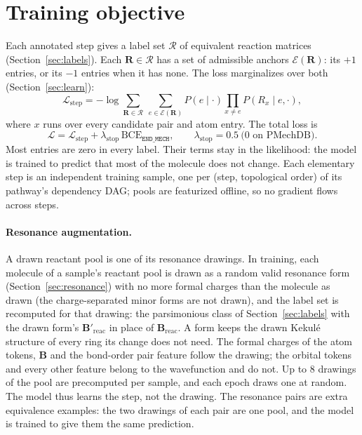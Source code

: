 \documentclass[11pt,a4paper]{article}
\newcommand{\vb}[1]{\bm{#1}}
\begin{document}
\section{Training objective}
\label{sec:loss}
Each annotated step gives a label set $\mathcal{R}$ of equivalent reaction matrices (Section~\ref{sec:labels}). Each $\vb{R}\in\mathcal{R}$ has a set of admissible anchors $\mathcal{E}(\vb{R})$: its $+1$ entries, or its $-1$ entries when it has none. The loss marginalizes over both (Section~\ref{sec:learn}):
\begin{equation}
\mathcal{L}_{\mathrm{step}}=-\log\sum_{\vb{R}\in\mathcal{R}}\ \sum_{e\in\mathcal{E}(\vb{R})}P(e\mid\cdot)\prod_{x\ne e}P(R_x\mid e,\cdot),
\end{equation}
where $x$ runs over every candidate pair and atom entry. The total loss is
\begin{equation}
\mathcal{L}=\mathcal{L}_{\mathrm{step}}+\lambda_{\mathrm{stop}}\,\mathrm{BCE}_{\texttt{END\_MECH}},\qquad \lambda_{\mathrm{stop}}=0.5\ \text{($0$ on PMechDB)}.
\end{equation}
Most entries are zero in every label. Their terms stay in the likelihood: the model is trained to predict that most of the molecule does not change. Each elementary step is an independent training sample, one per (step, topological order) of its pathway's dependency DAG; pools are featurized offline, so no gradient flows across steps.

\paragraph{Resonance augmentation.} A drawn reactant pool is one of its resonance drawings. In training, each molecule of a sample's reactant pool is drawn as a random valid resonance form (Section~\ref{sec:resonance}) with no more formal charges than the molecule as drawn (the charge-separated minor forms are not drawn), and the label set is recomputed for that drawing: the parsimonious class of Section~\ref{sec:labels} with the drawn form's $\vb{B}'_{\mathrm{reac}}$ in place of $\vb{B}_{\mathrm{reac}}$. A form keeps the drawn Kekul\'e structure of every ring its change does not need. The formal charges of the atom tokens, $\vb{B}$ and the bond-order pair feature follow the drawing; the orbital tokens and every other feature belong to the wavefunction and do not. Up to $8$ drawings of the pool are precomputed per sample, and each epoch draws one at random. The model thus learns the step, not the drawing. The resonance pairs are extra equivalence examples: the two drawings of each pair are one pool, and the model is trained to give them the same prediction.
\end{document}
